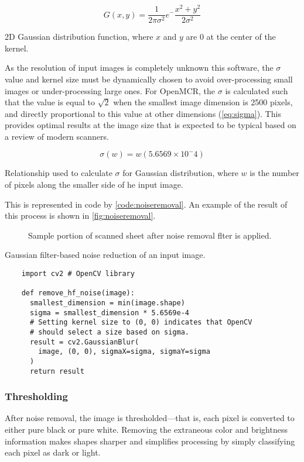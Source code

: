 \documentclass[12pt, letterpaper]{report}
\newcommand*{\itemref}[1]{\hypersetup{linkcolor=usfgreen}\hyperref[{#1}]{\autoref*{#1}}}
\newcommand*{\boxedimage}[1]{\fbox{\texttt{[image: img/\#1]}}}
\newcommand{\fig}[3]{
  \begin{figure}[h]
    \caption{#1}
    \label{#3}
    \centering
    \boxedimage{#2}
  \end{figure}
}
\newcommand{\eq}[3]{
  \begin{eqn}[h]
    #2
    \caption{#1}
    \label{#3}
  \end{eqn}
}
\begin{document}
\eq{2D Gaussian distribution function, where $x$ and $y$ are $0$ at the center of the kernel.}{\[ G(x,y)=\frac{1}{2\pi\sigma^2}e^-\frac{x^2+y^2}{2\sigma^2} \]}{eq:gaussian}

As the resolution of input images is completely unknown this software, the $\sigma$
value and kernel size must be dynamically chosen to avoid over-processing small images or
under-processing large ones. For OpenMCR, the $\sigma$ is calculated such that
the value is equal to $\sqrt{2}$ when the smallest image dimension is 2500
pixels, and directly proportional to this value at other dimensions (\itemref{eq:sigma}). This
provides optimal results at the image size that is expected to be
typical based on a review of modern scanners.

\eq{Relationship used to calculate $\sigma$ for Gaussian distribution, where $w$ is the number of pixels along the smaller side of he input image.}{\[ \sigma(w)=w(5.6569\times10^-4) \]}{eq:sigma}

This is represented in code by \itemref{code:noiseremoval}. An example of
the result of this process is shown in \itemref{fig:noiseremoval}.

\fig{Sample portion of scanned sheet after noise removal flter is applied.}{sample/noise_filtered.jpg}{fig:noiseremoval}

\begin{codesample}[h]
  \caption{Gaussian filter-based noise reduction of an input image.}
  \label{code:noiseremoval}
  \begin{verbatim}
    import cv2 # OpenCV library

    def remove_hf_noise(image):
      smallest_dimension = min(image.shape)
      sigma = smallest_dimension * 5.6569e-4
      # Setting kernel size to (0, 0) indicates that OpenCV
      # should select a size based on sigma.
      result = cv2.GaussianBlur(
        image, (0, 0), sigmaX=sigma, sigmaY=sigma
      )
      return result
  \end{verbatim}
\end{codesample}

\subsubsection{Thresholding}

After noise removal, the image is thresholded---that is, each
pixel is converted to either pure black or pure white.
Removing the extraneous color and brightness information
makes shapes sharper and simplifies processing by simply
classifying each pixel as dark or light.
\end{document}
